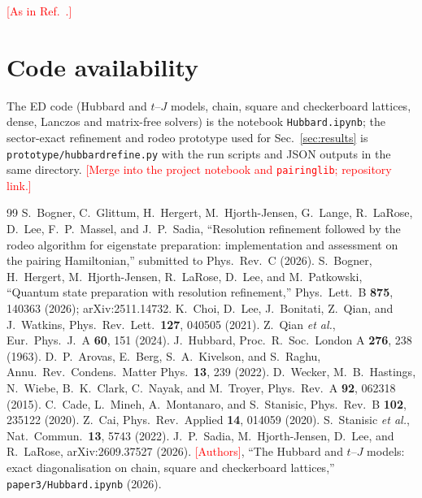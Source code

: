 \documentclass[
  aps,
  prc,
  reprint,
  superscriptaddress,
  floatfix,
  nofootinbib
]{revtex4-2}
\newcommand{\todo}[1]{\textcolor{red}{[#1]}}
\begin{document}
\begin{acknowledgments}
\todo{As in Ref.~\cite{EigenQPairing2026}.}
\end{acknowledgments}

\section*{Code availability}
The ED code (Hubbard and $t$--$J$ models, chain, square and checkerboard
lattices, dense, Lanczos and matrix-free solvers) is the notebook
\texttt{Hubbard.ipynb}; the sector-exact refinement and rodeo prototype
used for Sec.~\ref{sec:results} is \texttt{prototype/hubbardrefine.py} with
the run scripts and JSON outputs in the same directory.  \todo{Merge into
the project notebook and \texttt{pairinglib}; repository link.}

\begin{thebibliography}{99}
 S.~Bogner, C.~Glittum, H.~Hergert,
M.~Hjorth-Jensen, G.~Lange, R.~LaRose, D.~Lee, F.~P.~Massel, and J.~P.~Sadia,
``Resolution refinement followed by the rodeo algorithm for eigenstate
preparation: implementation and assessment on the pairing Hamiltonian,''
submitted to Phys.\ Rev.\ C (2026).
 S.~Bogner, H.~Hergert, M.~Hjorth-Jensen, R.~LaRose,
D.~Lee, and M.~Patkowski, ``Quantum state preparation with resolution
refinement,'' Phys.\ Lett.\ B \textbf{875}, 140363 (2026); arXiv:2511.14732.
 K.~Choi, D.~Lee, J.~Bonitati, Z.~Qian, and J.~Watkins,
Phys.\ Rev.\ Lett.\ \textbf{127}, 040505 (2021).
 Z.~Qian \emph{et al.}, Eur.\ Phys.\ J.\ A \textbf{60}, 151 (2024).
 J.~Hubbard, Proc.\ R.\ Soc.\ London A \textbf{276}, 238 (1963).
 D.~P.~Arovas, E.~Berg, S.~A.~Kivelson, and S.~Raghu,
Annu.\ Rev.\ Condens.\ Matter Phys.\ \textbf{13}, 239 (2022).
 D.~Wecker, M.~B.~Hastings, N.~Wiebe, B.~K.~Clark,
C.~Nayak, and M.~Troyer, Phys.\ Rev.\ A \textbf{92}, 062318 (2015).
 C.~Cade, L.~Mineh, A.~Montanaro, and S.~Stanisic,
Phys.\ Rev.\ B \textbf{102}, 235122 (2020).
 Z.~Cai, Phys.\ Rev.\ Applied \textbf{14}, 014059 (2020).
 S.~Stanisic \emph{et al.}, Nat.\ Commun.\ \textbf{13}, 5743 (2022).
 J.~P.~Sadia, M.~Hjorth-Jensen, D.~Lee, and R.~LaRose,
arXiv:2609.37527 (2026).
 \todo{Authors}, ``The Hubbard and $t$--$J$ models:
exact diagonalisation on chain, square and checkerboard lattices,''
\texttt{paper3/Hubbard.ipynb} (2026).
\end{thebibliography}
\end{document}
